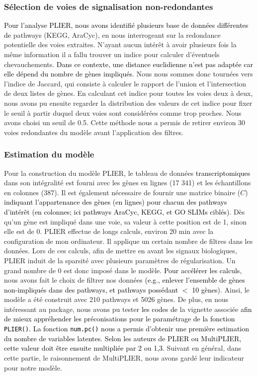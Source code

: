 \documentclass[twoside]{article}
\newcommand{\AR}[1]{\textcolor{black}{#1}}
\begin{document}
        \subsubsection{Sélection de voies de signalisation non-redondantes}

    \vspace{0.5cm}\AR{Pour l'analyse PLIER, nous avons identifié plusieurs base de données différentes de} pathways (KEGG, AraCyc), en nous interrogeant sur la redondance potentielle des voies extraites. N'ayant aucun intérêt à avoir plusieurs fois la même information il a fallu trouver un indice pour calculer d'éventuels chevauchements. \AR{Dans ce contexte, une distance euclidienne n'est pas adaptée car elle dépend du nombre de gènes impliqués}. Nous nous sommes donc tournées vers l'indice de Jaccard, qui consiste à calculer le rapport de l'union et l'intersection de deux listes de gènes. En calculant cet indice pour toutes les voies deux à deux, nous avons pu ensuite regarder la distribution des valeurs de cet indice pour fixer le seuil à partir duquel deux voies sont considérées comme trop proches. Nous avons choisi un seuil de 0.5. Cette méthode nous a permis de retirer environ 30 voies redondantes du modèle avant l'application des filtres.
    
    \subsubsection{Estimation du modèle}
    
    \vspace{0.5cm}Pour la construction du modèle PLIER, le tableau de données \AR{transcriptomiques} dans son intégralité est fourni avec les gènes en lignes (17 341) et les échantillons en colonnes (387). Il est également nécessaire de fournir une matrice binaire ($C$) \AR{indiquant l'appartenance des gènes (en lignes) pour chacun des pathways d'intérêt (en colonnes; ici pathways AraCyc, KEGG, et GO SLIMs ciblés)}. Dès qu'un gène est impliqué dans une voie, sa valeur à cette position est de 1, sinon elle est de 0. PLIER effectue de longs calculs, environ 20 min avec la configuration de mon ordinateur. Il applique un certain nombre de filtres dans les données. Lors de ces calculs, afin de mettre en avant les signaux biologiques, PLIER induit de la sparsité avec plusieurs paramètres de régularisation. Un grand nombre de 0 est donc imposé dans le modèle. \AR{Pour accélérer les calculs,} nous avons fait le choix de filtrer nos données \AR{(e.g., enlever l'ensemble de gènes non-impliqués dans des pathways, et pathways possédant $<$ 10 gènes)}. Ainsi, le modèle a été construit avec 210 pathways et 5026 gènes. De plus, en nous intéressant au package, nous avons pu tester \AR{les codes de} la vignette associée \AR{afin de mieux appréhender les préconisations pour le paramétrage de la fonction \texttt{PLIER()}. La fonction \texttt{num.pc()} nous a permis d'obtenir une première estimation du nombre de variables latentes}. \AR{Selon les auteurs de PLIER ou MultiPLIER, cette valeur doit être ensuite multipliée par 2 ou 1,3.} Suivant en général, dans cette partie, le raisonnement de MultiPLIER, nous avons gardé leur indicateur pour notre modèle.
\end{document}
